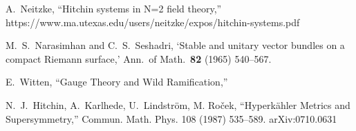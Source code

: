 \documentclass[oneside,english]{amsbook}
\numberwithin{section}{chapter}
\numberwithin{equation}{section}
\numberwithin{figure}{section}
\theoremstyle{plain}
\theoremstyle{definition}
\theoremstyle{remark}
\theoremstyle{definition}
\theoremstyle{definition}
\theoremstyle{plain}
\theoremstyle{plain}
\begin{document}
\begin{thebibliography}{AB}
A.~Neitzke, ``Hitchin systems in N=2 field theory,''
https://www.ma.utexas.edu/users/neitzke/expos/hitchin-systems.pdf

M.~S.~Narasimhan and C.~S.~Seshadri, `Stable
and unitary vector bundles on a compact Riemann surface,' Ann.~of
Math.~\textbf{82} (1965) 540--567.

E.~Witten, ``Gauge Theory and Wild Ramification,''

  N.~J.~Hitchin, A.~Karlhede, U.~Lindstr\"om, M. Ro\v{c}ek,
  ``Hyperk\"ahler Metrics and Supersymmetry,''
  Commun. Math. Phys. 108 (1987) 535--589.
arXiv:0710.0631\end{thebibliography}
\end{document}
